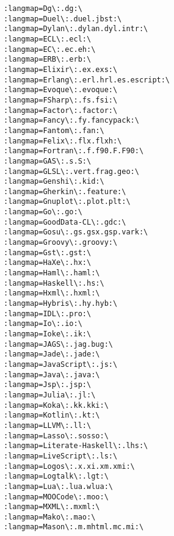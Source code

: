 \documentclass[11pt]{article}
\begin{document}
\begin{lstlisting}
                         :langmap=Dg\:.dg:\
                         :langmap=Duel\:.duel.jbst:\
                         :langmap=Dylan\:.dylan.dyl.intr:\
                         :langmap=ECL\:.ecl:\
                         :langmap=EC\:.ec.eh:\
                         :langmap=ERB\:.erb:\
                         :langmap=Elixir\:.ex.exs:\
                         :langmap=Erlang\:.erl.hrl.es.escript:\
                         :langmap=Evoque\:.evoque:\
                         :langmap=FSharp\:.fs.fsi:\
                         :langmap=Factor\:.factor:\
                         :langmap=Fancy\:.fy.fancypack:\
                         :langmap=Fantom\:.fan:\
                         :langmap=Felix\:.flx.flxh:\
                         :langmap=Fortran\:.f.f90.F.F90:\
                         :langmap=GAS\:.s.S:\
                         :langmap=GLSL\:.vert.frag.geo:\
                         :langmap=Genshi\:.kid:\
                         :langmap=Gherkin\:.feature:\
                         :langmap=Gnuplot\:.plot.plt:\
                         :langmap=Go\:.go:\
                         :langmap=GoodData-CL\:.gdc:\
                         :langmap=Gosu\:.gs.gsx.gsp.vark:\
                         :langmap=Groovy\:.groovy:\
                         :langmap=Gst\:.gst:\
                         :langmap=HaXe\:.hx:\
                         :langmap=Haml\:.haml:\
                         :langmap=Haskell\:.hs:\
                         :langmap=Hxml\:.hxml:\
                         :langmap=Hybris\:.hy.hyb:\
                         :langmap=IDL\:.pro:\
                         :langmap=Io\:.io:\
                         :langmap=Ioke\:.ik:\
                         :langmap=JAGS\:.jag.bug:\
                         :langmap=Jade\:.jade:\
                         :langmap=JavaScript\:.js:\
                         :langmap=Java\:.java:\
                         :langmap=Jsp\:.jsp:\
                         :langmap=Julia\:.jl:\
                         :langmap=Koka\:.kk.kki:\
                         :langmap=Kotlin\:.kt:\
                         :langmap=LLVM\:.ll:\
                         :langmap=Lasso\:.sosso:\
                         :langmap=Literate-Haskell\:.lhs:\
                         :langmap=LiveScript\:.ls:\
                         :langmap=Logos\:.x.xi.xm.xmi:\
                         :langmap=Logtalk\:.lgt:\
                         :langmap=Lua\:.lua.wlua:\
                         :langmap=MOOCode\:.moo:\
                         :langmap=MXML\:.mxml:\
                         :langmap=Mako\:.mao:\
                         :langmap=Mason\:.m.mhtml.mc.mi:\

\end{lstlisting}
\end{document}

